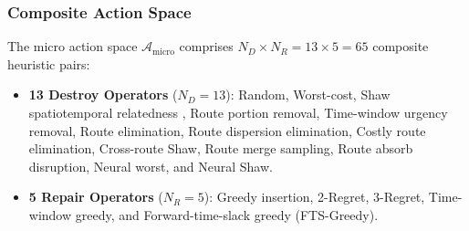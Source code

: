 \documentclass{ieeeaccess}
\begin{document}
\subsubsection{Composite Action Space}
The micro action space $\mathcal{A}_{\text{micro}}$ comprises $N_D \times N_R = 13 \times 5 = 65$ composite heuristic pairs:
\begin{itemize}
    \item \textbf{13 Destroy Operators} ($N_D=13$): Random, Worst-cost, Shaw spatiotemporal relatedness \cite{shaw1998using}, Route portion removal, Time-window urgency removal, Route elimination, Route dispersion elimination, Costly route elimination, Cross-route Shaw, Route merge sampling, Route absorb disruption, Neural worst, and Neural Shaw.
    \item \textbf{5 Repair Operators} ($N_R=5$): Greedy insertion, 2-Regret, 3-Regret, Time-window greedy, and Forward-time-slack greedy (FTS-Greedy).
\end{itemize}
\end{document}
